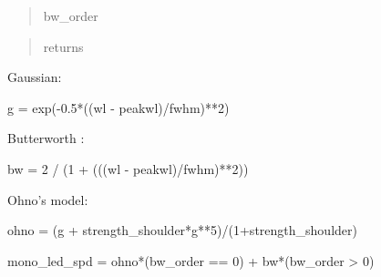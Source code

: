\documentclass[letterpaper,10pt,english]{sphinxmanual}
\begin{document}
\begin{fulllineitems}
\begin{description}
\begin{quote}
\begin{description}
\item[{bw\_order}] \leavevmode
{}

\end{description}\end{quote}

\item[{Returns:}] \leavevmode\begin{quote}\begin{description}
\item[{returns}] \leavevmode
{}

\end{description}\end{quote}

\item[{Note:}] \leavevmode
\begin{DUlineblock}{0em}
\item[] Gaussian:
\item[]
\begin{DUlineblock}{\DUlineblockindent}
\item[] g = exp(-0.5*((wl - peakwl)/fwhm)**2)
\item[] 
\end{DUlineblock}
\item[] Butterworth :
\item[]
\begin{DUlineblock}{\DUlineblockindent}
\item[] bw = 2 / (1 + (((wl - peakwl)/fwhm)**2))
\item[] 
\end{DUlineblock}
\item[] Ohno’s model:
\item[]
\begin{DUlineblock}{\DUlineblockindent}
\item[] ohno = (g + strength\_shoulder*g**5)/(1+strength\_shoulder)
\item[] 
\item[] mono\_led\_spd = ohno*(bw\_order == 0) + bw*(bw\_order \textgreater{} 0)
\end{DUlineblock}
\end{DUlineblock}


\end{description}
\end{fulllineitems}
\end{document}
